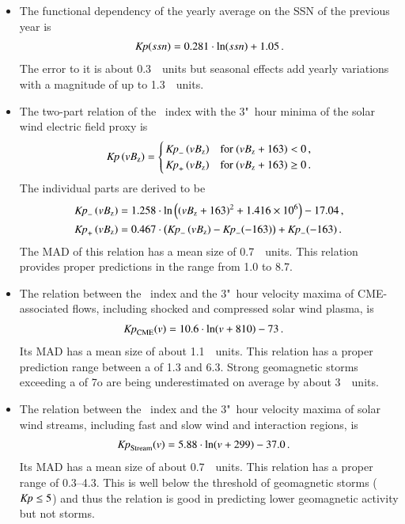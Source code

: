 \begin{itemize}
	\item The functional dependency of the yearly \Kp{} average on the SSN of the previous year is
	\begin{align*}
		\Kp(ssn) = 0.281 \cdot \ln(ssn) + 1.05	\,.
	\end{align*}
	The error to it is about 0.3~\Kp~units but seasonal effects add yearly variations with a magnitude of up to 1.3~\Kp~units.

	\item The two-part relation of the \Kp~index with the 3"~hour minima of the solar wind electric field proxy \vBz{} is
	\begin{align*}
		\text{\Kp}\left(vB_\text{z}\right) =
		\begin{cases}
			\,\text{\Kp}_-\left(vB_\text{z}\right) &\text{for~} (vB_\text{z} + 163) < 0	\,,\\
			\,\text{\Kp}_+\left(vB_\text{z}\right) &\text{for~} (vB_\text{z} + 163) \ge 0	\,.
		\end{cases}
	\end{align*}
	The individual parts are derived to be
	\begin{align*}
		\text{\Kp}_-\left(vB_\text{z}\right) &= 1.258 \cdot \ln\left(\left(vB_\text{z} + 163\right)^2 + \num{1.416e6}\right) - 17.04	\,,\\
		\text{\Kp}_+\left(vB_\text{z}\right) &= 0.467 \cdot \left(\text{\Kp}_-\left(vB_\text{z}\right) - \text{\Kp}_-(-163)\right) + \text{\Kp}_-(-163)	\,.
	\end{align*}
	The MAD of this relation has a mean size of 0.7~\Kp~units. This relation provides proper predictions in the \Kp{} range from \num{1.0} to \num{8.7}.

	\item The relation between the \Kp~index and the 3"~hour velocity maxima of CME-associated flows, including shocked and compressed solar wind plasma, is
	\begin{align*}
		\text{\Kp}_\text{CME}(v) &= 10.6 \cdot \ln(v + 810) - 73	\,.
	\end{align*}
	Its MAD has a mean size of about 1.1~\Kp~units. This relation has a proper prediction range between a \Kp{} of \num{1.3} and \num{6.3}. Strong geomagnetic storms exceeding a \Kp{} of 7o are being underestimated on average by about 3~\Kp~units.

	\item The relation between the \Kp~index and the 3"~hour velocity maxima of solar wind streams, including fast and slow wind and interaction regions, is
	\begin{align*}
		\text{\Kp}_\text{Stream}(v) &= 5.88 \cdot \ln(v + 299) - 37.0	\,.
	\end{align*}
	Its MAD has a mean size of about 0.7~\Kp~units. This relation has a proper \Kp{} range of \numrange{0.3}{4.3}. This is well below the threshold of geomagnetic storms ($\si{\Kp} \leq 5$) and thus the relation is good in predicting lower geomagnetic activity but not storms.
\end{itemize}

